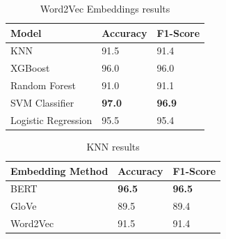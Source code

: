 \begin{table}[hbt!]
\begin{threeparttable}
\caption{Word2Vec Embeddings results}
\label{word2vec_embeddings_results}
\begin{tabular}{lll}
\toprule
\headrow Model & Accuracy & F1-Score\\
\midrule
KNN & 91.5 & 91.4 \\ 
XGBoost & 96.0 & 96.0 \\ 
Random Forest & 91.0 & 91.1 \\ 
SVM Classifier & \textbf{97.0} & \textbf{96.9} \\ 
Logistic Regression & 95.5 & 95.4 \\ 
\bottomrule
\end{tabular}
\end{threeparttable}
\end{table}

\begin{table}[hbt!]
\begin{threeparttable}
\caption{KNN results}
\label{knn_results}
\begin{tabular}{lll}
\toprule
\headrow Embedding Method & Accuracy & F1-Score\\
\midrule
BERT & \textbf{96.5} & \textbf{96.5} \\ 
GloVe & 89.5 & 89.4 \\ 
Word2Vec & 91.5 & 91.4 \\ 
\bottomrule
\end{tabular}
\end{threeparttable}
\end{table}

